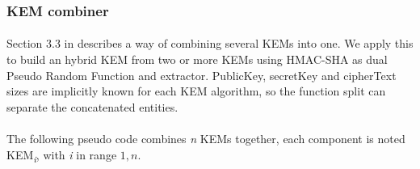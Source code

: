 \documentclass[a4paper,11pt]{article}
\begin{document}
\subsubsection{KEM combiner}
\paragraph*{}Section 3.3 in \citep{Bin18} describes a way of combining several KEMs into one. We apply this to build an hybrid KEM from two or more KEMs using HMAC-SHA as dual Pseudo Random Function and extractor. PublicKey, secretKey and cipherText sizes are implicitly known for each KEM algorithm, so the function {\sc split} can separate the concatenated entities.
\paragraph*{} The following pseudo code combines \textit{n} KEMs together, each component is noted KEM\textsubscript{\textit{i}}, with \textit{i} in range $1,n$.
\end{document}
